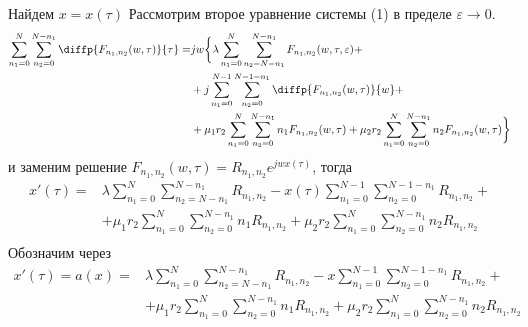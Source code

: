 Найдем $x=x(\tau)$ Рассмотрим второе уравнение системы (1) в пределе $\varepsilon \rightarrow 0$.
\begin{align*}
\sum_{n_1=0}^N\sum_{n_2=0}^{N-n_1} \diffp{F_{n_{1}, n_{2}}(w,\tau)}{\tau}=
&jw\bigg\{\lambda \sum_{n_1=0}^N\sum_{n_2=N-n_1}^{N-n_1} 
F_{n_{1}, n_{2}}(w,\tau, \varepsilon)+\\
&+ j\sum_{n_1=0}^{N-1}\sum_{n_2=0}^{N-1-n_1} 
\diffp{F_{n_{1}, n_{2}}(w,\tau)}{w}+\\
&+\mu_1 r_2 \sum_{n_1=0}^{N}\sum_{n_2=0}^{N-n_1} 
n_1 F_{n_{1}, n_{2}}(w,\tau)
+\mu_2 r_2 \sum_{n_1=0}^{N}\sum_{n_2=0}^{N-n_1} 
n_2 F_{n_{1}, n_{2}}(w,\tau)\bigg\}\\
\end{align*} 
и заменим решение $F_{n_{1}, n_{2}}(w,\tau)=R_{n_{1}, n_{2}}e^{jwx(\tau)}$, тогда
\begin{equation*}
	\begin{aligned}
		x'(\tau) =
		&\lambda \sum_{n_1=0}^N\sum_{n_2=N-n_1}^{N-n_1} 
		R_{n_{1}, n_{2}}
		- x(\tau)\sum_{n_1=0}^{N-1}\sum_{n_2=0}^{N-1-n_1} 
		R_{n_{1}, n_{2}}+\\
		&+\mu_1 r_2 \sum_{n_1=0}^{N}\sum_{n_2=0}^{N-n_1} 
		n_1 R_{n_{1}, n_{2}}
		+\mu_2 r_2 \sum_{n_1=0}^{N}\sum_{n_2=0}^{N-n_1} 
		n_2 R_{n_{1}, n_{2}}\\
	\end{aligned}
\end{equation*}
Обозначим через
\begin{equation}
	\begin{aligned}\label{a(x)}
		x'(\tau)=a(x)=&\lambda \sum_{n_1=0}^N\sum_{n_2=N-n_1}^{N-n_1} 
		R_{n_{1}, n_{2}}
		- x\sum_{n_1=0}^{N-1}\sum_{n_2=0}^{N-1-n_1} 
		R_{n_{1}, n_{2}}+\\
		&+\mu_1 r_2 \sum_{n_1=0}^{N}\sum_{n_2=0}^{N-n_1} 
		n_1 R_{n_{1}, n_{2}}
		+\mu_2 r_2 \sum_{n_1=0}^{N}\sum_{n_2=0}^{N-n_1} 
		n_2 R_{n_{1}, n_{2}}
	\end{aligned}
\end{equation}

